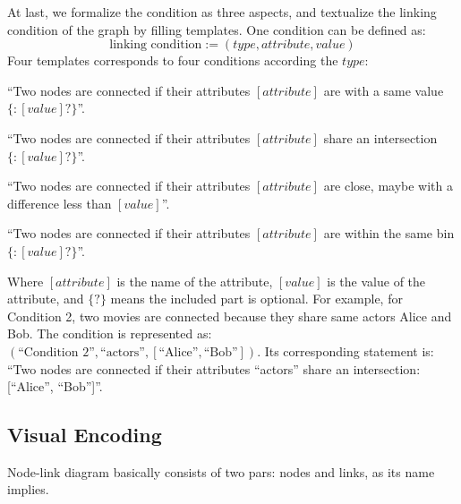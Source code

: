 At last, we formalize the condition as three aspects, and textualize the linking condition of the graph by filling templates. 
{\color{text-highlight}One condition can be defined as:}
\begin{equation}
    \text{linking condition} := ( type, attribute, value )
\end{equation}
Four templates corresponds to four conditions according the $type$:

\begin{compactenum}
    \item ``Two nodes are connected if their attributes $[{attribute}]$ are with a same value$\{: [{value}]?\}$''.
    \item ``Two nodes are connected if their attributes $[{attribute}]$ share an intersection$\{: [{value}]?\}$''.
    \item ``Two nodes are connected if their attributes $[{attribute}]$ are close, maybe with a difference less than $[{value}]$''.
    \item ``Two nodes are connected if their attributes $[{attribute}]$ are within the same bin$\{: [{value}]?\}$''.
\end{compactenum}

{\color{text-highlight}Where $[{attribute}]$ is the name of the attribute, $[{value}]$ is the value of the attribute, and $\{?\}$ means the included part is optional. For example, for Condition 2, two movies are connected because they share same actors Alice and Bob. The condition is represented as: $(\text{``Condition 2''}, \text{``actors''}, [\text{``Alice''}, \text{``Bob''}])$. Its corresponding statement is: ``Two nodes are connected if their attributes ``actors'' share an intersection: [``Alice'', ``Bob'']''.}

\subsection{Visual Encoding}

Node-link diagram basically consists of two pars: nodes and links, as its name implies.






